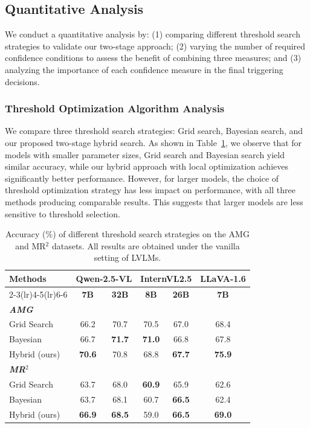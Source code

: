  \subsection{Quantitative Analysis}
We conduct a quantitative analysis by: (1) comparing different threshold search strategies to validate our two-stage approach; (2) varying the number of required confidence conditions to assess the benefit of combining three measures; and (3) analyzing the importance of each confidence measure in the final triggering decisions.

\subsubsection{Threshold Optimization Algorithm Analysis}


We compare three threshold search strategies: Grid search, Bayesian search, and our proposed two-stage hybrid search. 
As shown in Table~\ref{tab:threshold_strategy}, we observe that for models with smaller parameter sizes, Grid search and Bayesian search yield similar accuracy, while our hybrid approach with local optimization achieves significantly better performance. However, for larger models, the choice of threshold optimization strategy has less impact on performance, with all three methods producing comparable results. This suggests that larger models are less sensitive to threshold selection.

\begin{table}[htb]
\centering
\caption{Accuracy (\%) of different threshold search strategies on the AMG and MR$^2$ datasets. All results are obtained under the vanilla setting of LVLMs.}
\label{tab:threshold_strategy}

\setlength{\tabcolsep}{5pt}
\small
\begin{tabular}{lccccc}
\toprule
\textbf{Methods} &
\multicolumn{2}{c}{\textbf{Qwen-2.5-VL}} &
\multicolumn{2}{c}{\textbf{InternVL2.5}} &
\textbf{LLaVA-1.6} \\
\cmidrule(lr){2-3}\cmidrule(lr){4-5}\cmidrule(lr){6-6}
& \textbf{7B} & \textbf{32B} & \textbf{8B} & \textbf{26B} & \textbf{7B} \\
\midrule

\multicolumn{6}{l}{\textit{\textbf{AMG}}} \\
Grid Search    & 66.2 & 70.7 & 70.5 & 67.0 & 68.4 \\
Bayesian       & 66.7 & \textbf{71.7} & \textbf{71.0} & 66.8 & 67.8 \\
Hybrid (ours)  & \textbf{70.6} & 70.8 & 68.8 & \textbf{67.7} & \textbf{75.9} \\
\midrule
\multicolumn{6}{l}{\textit{\textbf{MR$^2$}}} \\
Grid Search    & 63.7 & 68.0 & \textbf{60.9} & 65.9 & 62.6 \\
Bayesian       & 63.7 & 68.1 & 60.7 & \textbf{66.5} & 62.4 \\
Hybrid (ours)  & \textbf{66.9} & \textbf{68.5} & 59.0 & \textbf{66.5} & \textbf{69.0} \\
\bottomrule
\end{tabular}
\end{table}

